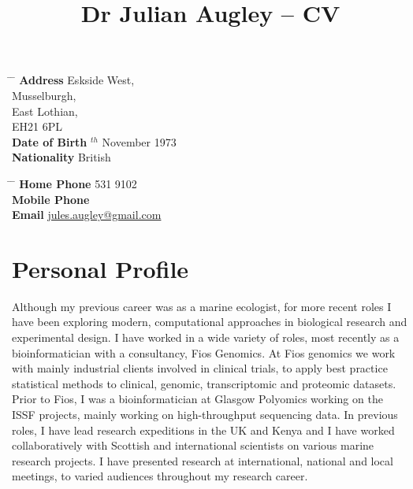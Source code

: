 \documentclass[10pt]{article} %
\begin{document}

\title{Dr Julian Augley -- CV} %


\parbox{0.5\textwidth}{ %
\begin{tabbing} %
\hspace{3cm} \= \hspace{4cm} \= \kill %
{\bf Address}  Eskside West,\\ %
\> Musselburgh, \\ %
\> East Lothian, \\ %
\> EH21 6PL \\ %
{\bf Date of Birth} $^{th}$ November 1973 \\ %
{\bf Nationality} \> British %
\end{tabbing}}
\hfill %
\parbox{0.5\textwidth}{ %
\begin{tabbing} %
\hspace{3cm} \= \hspace{4cm} \= \kill %
{\bf Home Phone}  531 9102 \\ %
{\bf Mobile Phone}  \\ %
{\bf Email} \> \href{mailto:jules.augley@gmail.com}{jules.augley@gmail.com} \\ %
\end{tabbing}}


\section{Personal Profile}

Although my previous career was as a marine ecologist, for more recent roles
I have been exploring modern, computational approaches in biological research
and experimental design. I have worked in a wide variety of roles, most recently
as a bioinformatician with a consultancy, Fios Genomics.
At Fios genomics we work with mainly
industrial clients involved in clinical trials, to apply best practice
statistical methods to clinical, genomic, transcriptomic and proteomic datasets.
Prior to Fios, I was a bioinformatician at Glasgow Polyomics working on the ISSF
projects, mainly working on high-throughput sequencing data. In previous roles,
I have lead research expeditions in the UK and Kenya and I have worked
collaboratively with Scottish and international scientists on various marine
research projects. I have presented research at international, national and
local meetings, to varied audiences throughout my research career.
\end{document}
